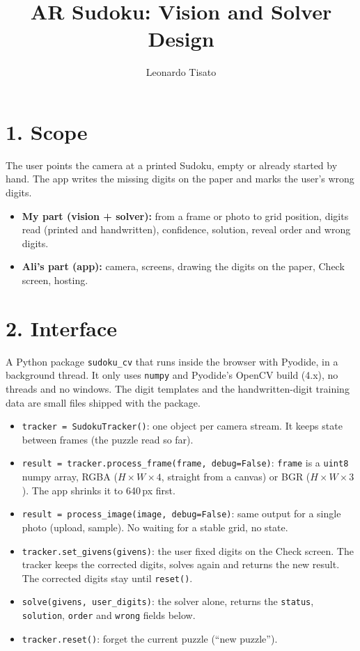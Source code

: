 \documentclass[10pt]{article}
\title{AR Sudoku: Vision and Solver Design}
\author{Leonardo Tisato}
\date{}
\begin{document}
\maketitle
\vspace{-2em}

\section*{1. Scope}

The user points the camera at a printed Sudoku, empty or already started by hand. The app writes
the missing digits on the paper and marks the user's wrong digits.

\begin{itemize}
  \item \textbf{My part (vision + solver):} from a frame or photo to grid position, digits read
        (printed and handwritten), confidence, solution, reveal order and wrong digits.
  \item \textbf{Ali's part (app):} camera, screens, drawing the digits on the paper, Check
        screen, hosting.
\end{itemize}

\section*{2. Interface}

A Python package \texttt{sudoku\_cv} that runs inside the browser with Pyodide, in a background
thread. It only uses \texttt{numpy} and Pyodide's OpenCV build (4.x), no threads and no windows.
The digit templates and the handwritten-digit training data are small files shipped with the
package.

\begin{itemize}
  \item \texttt{tracker = SudokuTracker()}: one object per camera stream. It keeps state between
        frames (the puzzle read so far).
  \item \texttt{result = tracker.process\_frame(frame, debug=False)}: \texttt{frame} is a
        \texttt{uint8} numpy array, RGBA ($H\times W\times4$, straight from a canvas) or BGR
        ($H\times W\times3$). The app shrinks it to 640\,px first.
  \item \texttt{result = process\_image(image, debug=False)}: same output for a single photo
        (upload, sample). No waiting for a stable grid, no state.
  \item \texttt{tracker.set\_givens(givens)}: the user fixed digits on the Check screen. The
        tracker keeps the corrected digits, solves again and returns the new result. The
        corrected digits stay until \texttt{reset()}.
  \item \texttt{solve(givens, user\_digits)}: the solver alone, returns the \texttt{status},
        \texttt{solution}, \texttt{order} and \texttt{wrong} fields below.
  \item \texttt{tracker.reset()}: forget the current puzzle (``new puzzle'').
\end{itemize}
\end{document}
